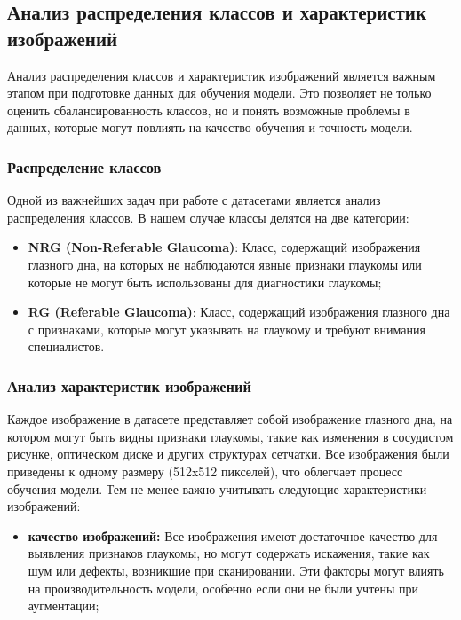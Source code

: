 {    %
    \vspace{13pt}
    \subsection{Анализ распределения классов и характеристик изображений}

    Анализ распределения классов и характеристик изображений является важным этапом при подготовке данных для обучения модели. Это позволяет не только оценить сбалансированность классов, но и понять возможные проблемы в данных, которые могут повлиять на качество обучения и точность модели.

    \subsubsection*{Распределение классов}

    Одной из важнейших задач при работе с датасетами является анализ распределения классов. В нашем случае классы делятся на две категории:
    \begin{itemize}
        \item \textbf{NRG (Non-Referable Glaucoma)}: Класс, содержащий изображения глазного дна, на которых не наблюдаются явные признаки глаукомы или которые не могут быть использованы для диагностики глаукомы;
        \item \textbf{RG (Referable Glaucoma)}: Класс, содержащий изображения глазного дна с признаками, которые могут указывать на глаукому и требуют внимания специалистов.
    \end{itemize}

    \subsubsection*{Анализ характеристик изображений}

    Каждое изображение в датасете представляет собой изображение глазного дна, на котором могут быть видны признаки глаукомы, такие как изменения в сосудистом рисунке, оптическом диске и других структурах сетчатки. Все изображения были приведены к одному размеру (512x512 пикселей), что облегчает процесс обучения модели. Тем не менее важно учитывать следующие характеристики изображений:

    \begin{itemize}
        \item \textbf{качество изображений:} Все изображения имеют достаточное качество для выявления признаков глаукомы, но могут содержать искажения, такие как шум или дефекты, возникшие при сканировании. Эти факторы могут влиять на производительность модели, особенно если они не были учтены при аугментации;
        

\end{itemize}}
